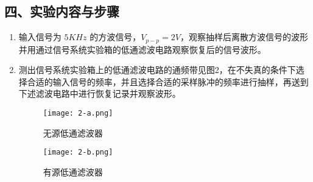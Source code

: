 \documentclass[dvipsnames, svgnames,a4paper,11pt]{article}
\begin{document}
\subsection*{四、实验内容与步骤}
\begin{enumerate}
  \item 输入信号为 $5KHz$ 的方波信号，$V_{p-p} = 2V$，观察抽样后离散方波信号的波形并用通过信号系统实验箱的低通滤波电路观察恢复后的信号波形。
  \item 测出信号系统实验箱上的低通滤波电路的通频带见图2，在不失真的条件下选择合适的输入信号的频率，并且选择合适的采样脉冲的频率进行抽样，再送到下述滤波电路中进行恢复记录并观察波形。
  \begin{figure}[htbp]
    \centering
    \begin{minipage}[t]{0.48\textwidth}
    \centering
    \texttt{[image: 2-a.png]}
    \caption{无源低通滤波器}
    \end{minipage}
    \begin{minipage}[t]{0.48\textwidth}
    \centering
    \texttt{[image: 2-b.png]}
    \caption{有源低通滤波器}
    \end{minipage}
  \end{figure}
\end{enumerate}

\newpage
\end{document}

